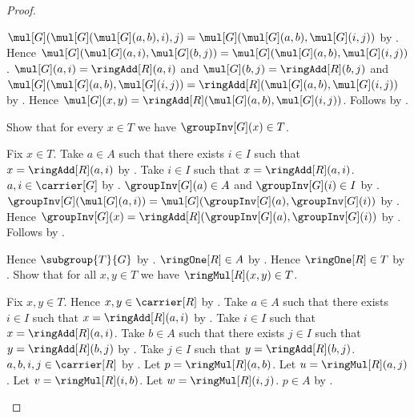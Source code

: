 \begin{proof}
\begin{subproof}
        $\mul[G](\mul[G](\mul[G](a,b),i),j)
            =\mul[G](\mul[G](a,b),\mul[G](i,j))$ by
            .
        Hence $\mul[G](\mul[G](a,i),\mul[G](b,j))
            =\mul[G](\mul[G](a,b),\mul[G](i,j))$.
        $\mul[G](a,i)=\ringAdd[R](a,i)$ and
            $\mul[G](b,j)=\ringAdd[R](b,j)$ and
            $\mul[G](\mul[G](a,b),\mul[G](i,j))
                =\ringAdd[R](\mul[G](a,b),\mul[G](i,j))$ by
            .
        Hence $\mul[G](x,y)
            =\ringAdd[R](\mul[G](a,b),\mul[G](i,j))$.
        Follows by .
    \end{subproof}
    Show that for every $x\in T$ we have $\groupInv[G](x)\in T$.
    \begin{subproof}
        Fix $x\in T$.
        Take $a\in A$ such that there exists $i\in I$ such that
            $x=\ringAdd[R](a,i)$ by .
        Take $i\in I$ such that $x=\ringAdd[R](a,i)$.
        $a,i\in\carrier[G]$ by .
        $\groupInv[G](a)\in A$ and $\groupInv[G](i)\in I$ by
            .
        $\groupInv[G](\mul[G](a,i))
            =\mul[G](\groupInv[G](a),\groupInv[G](i))$ by
            .
        Hence $\groupInv[G](x)
            =\ringAdd[R](\groupInv[G](a),\groupInv[G](i))$ by
            .
        Follows by .
    \end{subproof}
    Hence $\subgroup{T}{G}$ by .
    $\ringOne[R]\in A$ by .
    Hence $\ringOne[R]\in T$ by
        .
    Show that for all $x,y\in T$ we have $\ringMul[R](x,y)\in T$.
    \begin{subproof}
        Fix $x,y\in T$.
        Hence $x,y\in\carrier[R]$ by .
        Take $a\in A$ such that there exists $i\in I$ such that
            $x=\ringAdd[R](a,i)$ by .
        Take $i\in I$ such that $x=\ringAdd[R](a,i)$.
        Take $b\in A$ such that there exists $j\in I$ such that
            $y=\ringAdd[R](b,j)$ by .
        Take $j\in I$ such that $y=\ringAdd[R](b,j)$.
        $a,b,i,j\in\carrier[R]$ by
            .
        Let $p=\ringMul[R](a,b)$.
        Let $u=\ringMul[R](a,j)$.
        Let $v=\ringMul[R](i,b)$.
        Let $w=\ringMul[R](i,j)$.
        $p\in A$ by .

\end{subproof}
\end{proof}
